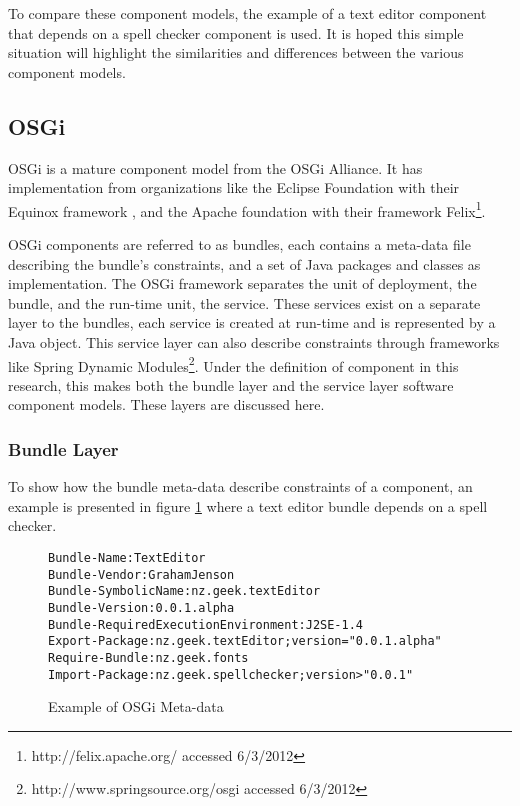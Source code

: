 To compare these component models, the example of a text editor component that depends on a spell checker component is used.
It is hoped this simple situation will highlight the similarities and differences between the various component models.

\subsection{OSGi}
OSGi is a mature component model from the OSGi Alliance.
It has implementation from organizations like the Eclipse Foundation with their Equinox framework \citep{mcaffer2010osgi}, 
and the Apache foundation with their framework Felix\footnote{http://felix.apache.org/ accessed 6/3/2012}.

OSGi components are referred to as bundles, each contains a meta-data file describing the bundle's constraints, and a set of Java packages and classes as implementation.
The OSGi framework separates the unit of deployment, the bundle, and the run-time unit, the service.
These services exist on a separate layer to the bundles, each service is created at run-time and is represented by a Java object.
This service layer can also describe constraints through frameworks like Spring Dynamic Modules\footnote{http://www.springsource.org/osgi accessed 6/3/2012}.
Under the definition of component in this research, this makes both the bundle layer and the service layer software component models.
These layers are discussed here.

\subsubsection{Bundle Layer}
To show how the bundle meta-data describe constraints of a component,
an example is presented in figure \ref{osgibundle} where a text editor bundle depends on a spell checker.
\begin{figure}[htp]
\begin{center}
\begin{framed}
\begin{alltt}
Bundle-Name: TextEditor
Bundle-Vendor: Graham Jenson
Bundle-SymbolicName: nz.geek.textEditor
Bundle-Version: 0.0.1.alpha
Bundle-RequiredExecutionEnvironment: J2SE-1.4
Export-Package: nz.geek.textEditor;version="0.0.1.alpha"
Require-Bundle: nz.geek.fonts
Import-Package: nz.geek.spellchecker;version>"0.0.1"
\end{alltt}
\end{framed}
  \caption{Example of OSGi Meta-data}
  \label{osgibundle}
\end{center}
\end{figure}

